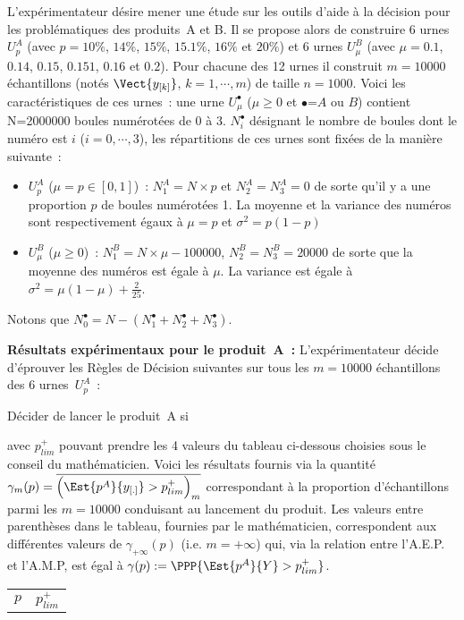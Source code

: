 \documentclass[10pt]{report}
\begin{document}
\begin{exercice} $ $

L'expérimentateur désire mener une étude sur les outils d'aide à la décision pour les problématiques des produits~A et B. Il se propose alors de construire 6 urnes $U^A_p$ (avec $p=10\%$, $14\%$, $15\%$, $15.1\%$, $16\%$ et $20\%$) et 6 urnes $U^B_\mu$ (avec $\mu=0.1$, $0.14$, $0.15$, $0.151$, $0.16$ et $0.2$). Pour chacune des 12 urnes il construit $m=10000$ échantillons (notés $\Vect{y_{[k]}}$, $k=1,\cdots,m$) de taille $n=1000$. Voici les caractéristiques de ces urnes~:
une urne $U^\bullet_\mu$ ($\mu\geq0$ et $\bullet$=$A$ ou $B$) contient N=2000000 boules numérotées de 0 à 3. $N^\bullet_i$ désignant le nombre de boules dont le numéro est $i$ ($i=0,\cdots,3$), les répartitions de ces urnes sont fixées de la manière suivante~:
\begin{itemize}
\item $U^A_p$ ($\mu=p\in [0,1]$)~: $N^A_1=N\times p$ et $N^A_2=N^A_3=0$ de sorte qu'il y a une proportion $p$ de boules numérotées 1. La moyenne et la variance des numéros sont respectivement égaux à $\mu=p$ et $\sigma^2=p(1-p)$
\item $U^B_\mu$ ($\mu\geq0$)~: $N^B_1=N\times \mu -100000$, $N^B_2=N^B_3=20000$ de sorte que la moyenne des numéros est égale à $\mu$. La variance est égale à $\sigma^2=\mu(1-\mu)+\frac{2}{25}$.
\end{itemize}
Notons que $N^\bullet_0=N-(N^\bullet_1+N^\bullet_2+N^\bullet_3)$.

\noindent \textbf{Résultats expérimentaux pour le produit~A~:}
L'expérimentateur décide d'éprouver les Règles de Décision suivantes sur tous les $m=10000$ échantillons des 6 urnes~$U^A_p$~:
\begin{center}
Décider de lancer le produit~A si 
\end{center} 
avec $p^+_{lim}$ pouvant prendre les 4 valeurs du tableau ci-dessous choisies sous le conseil du mathématicien. Voici les résultats fournis via la quantité $\gamma_m(p)=\overline{\Big(\Est{p^A}{y_{[.]}}>p^+_{lim}\Big)_m}$ correspondant à la proportion d'échantillons parmi les $m=10000$ conduisant au lancement du produit. Les valeurs entre parenthèses dans le tableau, fournies par le mathématicien, correspondent aux différentes valeurs de $\gamma_{+\infty}(p)$ (i.e. $m=+\infty$) qui, via la relation entre l'A.E.P. et l'A.M.P, est égal à $\gamma(p):=\PPP{\Est{p^A}{Y}>p^+_{lim}}$. 

\begin{center}
\begin{tabular}{|c|rl|rl|rl|rl|}\cline{1-9}
        \multirow{2}{*}{$p$}
         & 
    \multicolumn{8}{c|}{$p^+_{lim}$}
    

\end{tabular}
\end{center}
\end{exercice}
\end{document}
